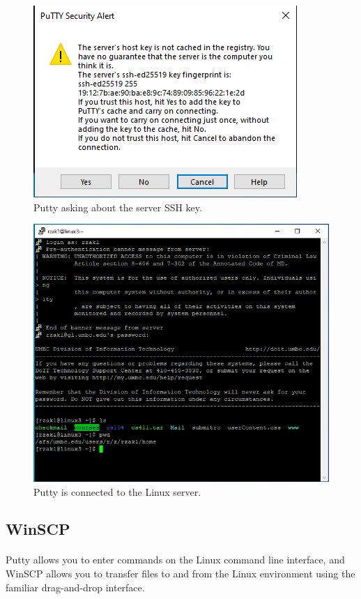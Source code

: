 \documentclass[letter,11pt]{article}
\begin{document}
\begin{figure}
\centering
\includegraphics[scale=0.7]{Images/putty_connect_2_first_time.png}
\caption{Putty asking about the server SSH key.}
\label{fig:puttyserverkey}
\end{figure}

\begin{figure}
\centering
\includegraphics[scale=0.7]{Images/putty_connected.png}
\caption{Putty is connected to the Linux server.}
\label{fig:puttyconnected}
\end{figure}

\FloatBarrier
\subsection{WinSCP}
\paragraph{}Putty allows you to enter commands on the Linux command line interface, and WinSCP allows you to transfer files to and from the Linux environment using the familiar drag-and-drop interface.
\end{document}
